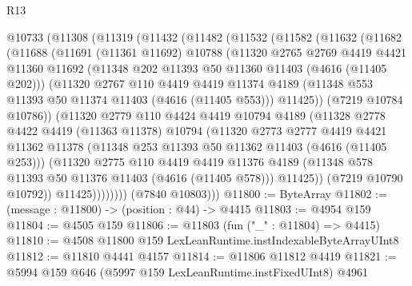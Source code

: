 \begin{lexlean}{R13}
\begin{coremodule}
  @10733
    (@11308
      (@11319
        (@11432
          (@11482
            (@11532
              (@11582
                (@11632
                  (@11682
                    (@11688
                      (@11691
                        (@11361 @11692)
                        @10788
                        (@11320
                          @2765
                          @2769
                          @4419
                          @4421
                          @11360
                          @11692
                          (@11348 @202 @11393 @50 @11360 @11403 (@4616 (@11405 @202)))
                          (@11320
                            @2767
                            @110
                            @4419
                            @4419
                            @11374
                            @4189
                            (@11348 @553 @11393 @50 @11374 @11403 (@4616 (@11405 @553)))
                            @11425))
                        (@7219 @10784 @10786))
                      (@11320
                        @2779
                        @110
                        @4424
                        @4419
                        @10794
                        @4189
                        (@11328
                          @2778
                          @4422
                          @4419
                          (@11363 @11378)
                          @10794
                          (@11320
                            @2773
                            @2777
                            @4419
                            @4421
                            @11362
                            @11378
                            (@11348 @253 @11393 @50 @11362 @11403 (@4616 (@11405 @253)))
                            (@11320
                              @2775
                              @110
                              @4419
                              @4419
                              @11376
                              @4189
                              (@11348 @578 @11393 @50 @11376 @11403 (@4616 (@11405 @578)))
                              @11425))
                          (@7219 @10790 @10792))
                        @11425))))))))
        (@7840 @10803)))
@11800 := ByteArray
@11802 := (message : @11800) -> (position : @44) -> @4415
@11803 := @4954 @159
@11804 := @4505 @159
@11806 := @11803 (fun ("_" : @11804) => @4415)
@11810 := @4508 @11800 @159 LexLeanRuntime.instIndexableByteArrayUInt8
@11812 := @11810 @4441 @4157
@11814 := @11806 @11812 @4419
@11821 := @5994 @159 @646 (@5997 @159 LexLeanRuntime.instFixedUInt8) @4961

\end{coremodule}
\end{lexlean}
